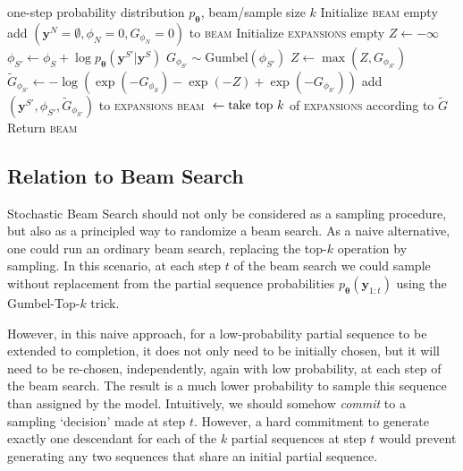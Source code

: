 \begin{algorithm}[H]
  \centering
  \scriptsize
  \caption{StochasticBeamSearch($p_{\bm{\theta}}$, $k$)} \label{alg:stochastic_beam_search}
  \begin{algorithmic}[1]
  	   one-step probability distribution $p_{\bm{\theta}}$, beam/sample size $k$
  	  \STATE \textnormal{Initialize } \textsc{beam} empty
  	  \STATE add $(\bm{y}^N=\emptyset, \phi_N = 0, G_{\phi_N} = 0)$ to \textsc{beam}
  	    \STATE \textnormal{Initialize } \textsc{expansions} \textnormal{ empty}
  	        \STATE $Z \gets - \infty$
  	            \STATE $\phi_{S'} \gets \phi_{S} + \log p_{\bm{\theta}}(\bm{y}^{S'} | \bm{y}^S)$
  	            \STATE $G_{\phi_{S'}} \sim \text{Gumbel}(\phi_{S'})$
  	            \STATE $Z \gets \max(Z, G_{\phi_{S'}})$
  	        \ENDFOR
  	            \STATE $\tilde{G}_{\phi_{S'}} \gets - \log( \exp( - G_{\phi_S} ) - \exp ( - Z) + \exp ( - G_{\phi_{S'}}) )$
  	            \STATE add $(\bm{y}^{S'}, \phi_{S'}, \tilde{G}_{\phi_{S'}})$ to \textsc{expansions}
  	        \ENDFOR
  	    \ENDFOR
  	    \STATE \textsc{beam} ${} \gets \textnormal{take } \text{top $k$}$ of \textsc{expansions} according to $\tilde{G}$
  	  \ENDFOR
  	  \STATE Return \textsc{beam}
  \end{algorithmic}
\end{algorithm}

\subsection{Relation to Beam Search}
Stochastic Beam Search should not only be considered as a sampling procedure, but also as a principled way to randomize a beam search. As a naive alternative, one could run an ordinary beam search, replacing the top-$k$ operation by sampling. In this scenario, at each step $t$ of the beam search we could sample without replacement from the partial sequence probabilities $p_{\bm{\theta}}(\bm{y}_{1:t})$ using the Gumbel-Top-$k$ trick. 

However, in this naive approach, for a low-probability partial sequence to be extended to completion, it does not only need to be initially chosen, but it will need to be re-chosen, independently, again with low probability, at each step of the beam search. The result is a much lower probability to sample this sequence than assigned by the model. Intuitively, we should somehow \emph{commit} to a sampling `decision' made at step $t$. However, a hard commitment to generate exactly one descendant for each of the $k$ partial sequences at step $t$ would prevent generating any two sequences that share an initial partial sequence.

